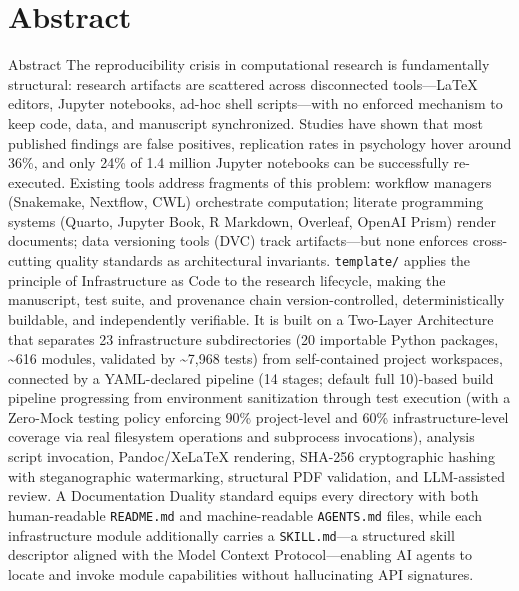 \documentclass[
  ignorenonframetext,
]{beamer}
\author{\texorpdfstring{}{}}
\date{}
\begin{document}
\section{Abstract}\label{abstract}

\begin{frame}{Abstract}
The reproducibility crisis in computational research is fundamentally
structural: research artifacts are scattered across disconnected
tools---LaTeX editors, Jupyter notebooks, ad-hoc shell scripts---with no
enforced mechanism to keep code, data, and manuscript synchronized.
Studies have shown that most published findings are false positives,
replication rates in psychology hover around 36\%, and only 24\% of 1.4
million Jupyter notebooks can be successfully re-executed. Existing
tools address fragments of this problem: workflow managers (Snakemake,
Nextflow, CWL) orchestrate computation; literate programming systems
(Quarto, Jupyter Book, R Markdown, Overleaf, OpenAI Prism) render
documents; data versioning tools (DVC) track artifacts---but none
enforces cross-cutting quality standards as architectural invariants.
\texttt{template/} applies the principle of Infrastructure as Code to
the research lifecycle, making the manuscript, test suite, and
provenance chain version-controlled, deterministically buildable, and
independently verifiable. It is built on a Two-Layer Architecture that
separates 23 infrastructure subdirectories (20 importable Python
packages, \textasciitilde616 modules, validated by \textasciitilde7,968
tests) from self-contained project workspaces, connected by a
YAML-declared pipeline (14 stages; default full 10)-based build pipeline
progressing from environment sanitization through test execution (with a
Zero-Mock testing policy enforcing 90\% project-level and 60\%
infrastructure-level coverage via real filesystem operations and
subprocess invocations), analysis script invocation, Pandoc/XeLaTeX
rendering, SHA-256 cryptographic hashing with steganographic
watermarking, structural PDF validation, and LLM-assisted review. A
Documentation Duality standard equips every directory with both
human-readable \texttt{README.md} and machine-readable
\texttt{AGENTS.md} files, while each infrastructure module additionally
carries a \texttt{SKILL.md}---a structured skill descriptor aligned with
the Model Context Protocol---enabling AI agents to locate and invoke
module capabilities without hallucinating API signatures.


\end{frame}
\end{document}
